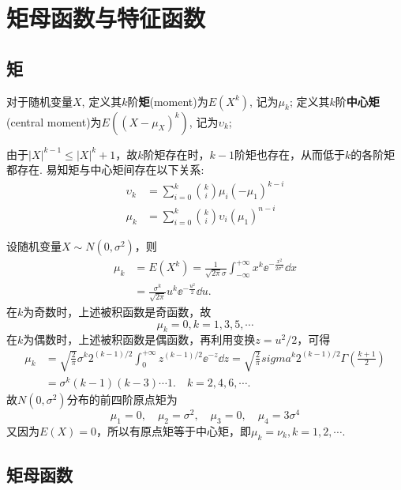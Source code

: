 \section{矩母函数与特征函数}

\subsection{矩}

\begin{definition}
    对于随机变量$X$, 定义其$k$阶\textbf{矩}(moment)为$E(X^k)$, 记为$\mu_k$; 定义其$k$阶\textbf{中心矩}(central moment)为$E((X-\mu_X)^k)$, 记为$\upsilon_k$;
\end{definition}
由于$|X|^{k-1}\le |X|^k+1$，故$k$阶矩存在时，$k-1$阶矩也存在，从而低于$k$的各阶矩都存在.
易知矩与中心矩间存在以下关系:
\begin{align*}
    \upsilon_k & =\sum_{i=0}^k \binom{k}{i} \mu_i (-\mu_1)^{k-i}     \\
    \mu_k      & =\sum_{i=0}^k \binom{k}{i} \upsilon_i (\mu_1)^{n-i}
\end{align*}

\begin{example}
    设随机变量$X\sim N(0,\sigma^2)$，则
    \begin{align*}
        \mu_k & = E(X^k) = \frac1{\sqrt{2\pi}\sigma}\int_{-\infty}^{+\infty} x^k\ee^{-\frac{x^2}{2\sigma^2}} \dd x \\
              & = \frac{\sigma^k}{\sqrt{2\pi}} u^k\ee^{-\frac{u^2}2}\dd u.
    \end{align*}
    在$k$为奇数时，上述被积函数是奇函数，故
    \[ \mu_k = 0, k=1,3,5,\cdots \]
    在$k$为偶数时，上述被积函数是偶函数，再利用变换$z=u^2/2$，可得
    \begin{align*}
        \mu_k & = \sqrt{\frac2\pi}\sigma^k2^{(k-1)/2} \int_0^{+\infty}z^{(k-1)/2}\ee^{-z} \dd z = \sqrt{\frac2\pi}sigma^k2^{(k-1)/2} \Gamma\left(  \frac{k+1}2 \right) \\
              & = \sigma^k(k-1)(k-3)\cdots1.\quad k=2,4,6,\cdots.
    \end{align*}
    故$N(0,\sigma^2)$分布的前四阶原点矩为
    \[ \mu_1 = 0,\quad \mu_2 = \sigma^2,\quad \mu_3 = 0,\quad \mu_4 = 3\sigma^4 \]
    又因为$E(X)=0$，所以有原点矩等于中心矩，即$\mu_k=\nu_k,k=1,2,\cdots$.
\end{example}

\subsection{矩母函数}

